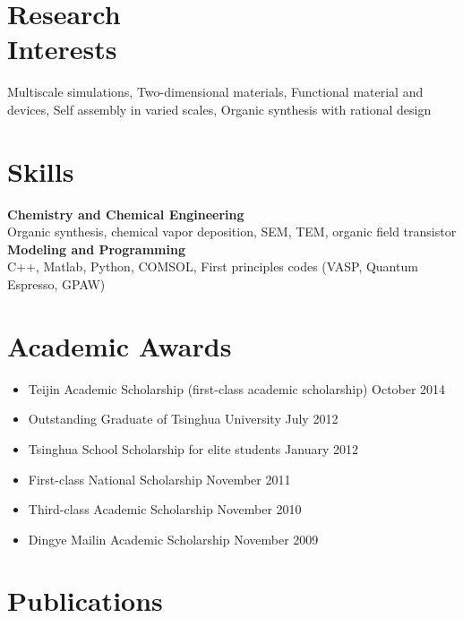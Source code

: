 \documentclass[margin]{res}
\begin{document}
\begin{resume}
 \section{Research \\Interests}
 Multiscale simulations, Two-dimensional materials, Functional material and devices, Self assembly in varied scales, Organic synthesis with  rational design 


 \section{Skills}
 \textbf{Chemistry and Chemical Engineering}\\
 Organic synthesis, chemical vapor deposition, SEM, TEM, organic field transistor
 \textbf{Modeling and Programming}\\
 C++, Matlab, Python, COMSOL, First principles codes (VASP, Quantum Espresso, GPAW)
 
                

\section{Academic Awards}
\begin{itemize}
   \item Teijin Academic Scholarship (first-class academic scholarship) \hfill October 2014
   \item Outstanding Graduate of Tsinghua University \hfill July 2012
   \item Tsinghua School Scholarship for elite students \hfill January 2012
   \item First-class National Scholarship \hfill November 2011
   \item Third-class Academic Scholarship \hfill November 2010
   \item Dingye Mailin Academic Scholarship \hfill November 2009
\end{itemize}



\section{Publications}
\begin{enumerate}



\end{enumerate}
\end{resume}
\end{document}

